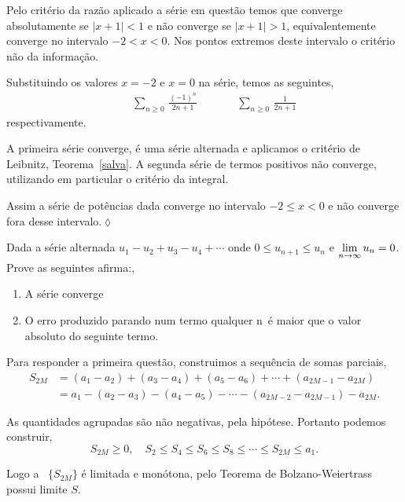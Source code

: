 \solo Pelo crit\'{e}rio da raz\~{a}o aplicado a s\'{e}rie em quest\~{a}o temos que
converge absolutamente se $|x+1|<1$ e n\~{a}o converge se $|x+1|>1$,
equivalentemente converge no intervalo $-2<x<0$. Nos pontos
extremos deste intervalo o crit\'{e}rio n\~{a}o da informa\c{c}\~{a}o.

Substituindo os valores $x=-2$ e $x=0$ na s\'{e}rie, temos as
seguintes,
\begin{align*}
  &\quad \sum_{n\geq 0}\,\frac{(-1)^n}{2n+1}\quad &&\quad \sum_{n\geq 0}\,\frac{1}{2n+1}
\end{align*}
respectivamente.

A primeira s\'{e}rie converge, \'{e} uma s\'{e}rie alternada e aplicamos o
crit\'{e}rio de Leibnitz, Teorema~\ref{salva}. A segunda s\'{e}rie de termos
positivos n\~{a}o converge, utilizando em particular o crit\'{e}rio da
integral.

Assim a s\'{e}rie de pot\^{e}ncias dada converge no intervalo $-2\leq x<0$ e
n\~{a}o converge fora desse intervalo.\hfill \(\lozenge\)


\begin{exer}  Dada a s\'erie alternada $u_1-u_2+u_3-u_4+\cdots$ onde
  $0\leq u_{n+1}\leq u_{n}$ e $\displaystyle{\lim_{n\to\infty}u_n=0}$.
  Prove as seguintes afirma\coes:,
\begin{enumerate}[label=\rm{(\alph*)},leftmargin=4em,ref=\rm{(\alph*)}]
  \item A s\'erie converge
  \item O erro produzido parando num termo qualquer n\ao\ \'e maior que o
  valor absoluto do seguinte termo.
\end{enumerate}
\end{exer}

\solo Para responder a primeira quest\~{a}o, construimos a sequ\^{e}ncia
de somas parciais,
\begin{align*}
    S_{2M}&=(a_1-a_2)+(a_3-a_4)+(a_5-a_6)+\cdots+(a_{2M-1}-a_{2M})\\[2ex]
    &=a_1-(a_2-a_3)-(a_4-a_5)-\cdots-(a_{2M-2}-a_{2M-1})-a_{2M}.
\end{align*}

As quantidades agrupadas s\~{a}o n\~{a}o negativas, pela hip\'{o}tese.
Portanto podemos construir,
\begin{equation*}
    S_{2M}\ge 0,\quad S_2\le S_4\le S_6\le S_8\le \cdots \le
    S_{2M}\le a_1.
\end{equation*}

Logo a \seq\ $\{S_{2M}\}$ \'{e} limitada e mon\'{o}tona, pelo Teorema de
Bolzano-Weiertrass possui limite $S$.

